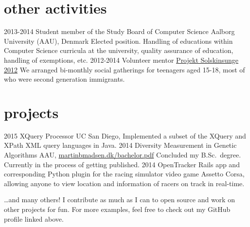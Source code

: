 \documentclass{afriggeri-cv/friggeri-cv}
\newcommand{\aau}{%
  Aalborg University (AAU), Denmark
}
\begin{document}
\section{other activities}
\begin{entrylist}
  \entry
    {2013-2014}
    {Student member of the Study Board of Computer Science}
    {\aau}
    {Elected position. Handling of educations within Computer Science curricula at the university, quality assurance of education, handling of exemptions, etc.}
  \entry
    {2012-2014}
    {Volunteer mentor}
    {\href{http://www.urk.dk/hvad-goer-vi/mentoring-og-raadgivning/solskinsunge/}{Projekt Solskinsunge 2012}}
    {We arranged bi-monthly social gatherings for teenagers aged 15-18, most of who were second generation immigrants.}
  
\end{entrylist}

\section{projects}
\begin{entrylist}
  \entry
    {2015}
    {XQuery Processor}
    {UC San Diego, }
    {Implemented a subset of the XQuery and XPath XML query languages in Java.}
  \entry
    {2014}
    {Diversity Measurement in Genetic Algorithms}
    {AAU, \href{http://martinbmadsen.dk/bachelor.pdf}{martinbmadsen.dk/bachelor.pdf}}
    {Concluded my B.Sc.\ degree. Currently in the process of getting published.}
  \entry
    {2014}
    {OpenTracker}
    {}
    {Rails app and corresponding Python plugin for the racing simulator video game Assetto Corsa, allowing anyone to view location and information of racers on track in real-time.}
\end{entrylist}

\dots and many others! I contribute as much as I can to open source and work on other projects for fun. For more examples, feel free to check out my GitHub profile linked above.
\end{document}
